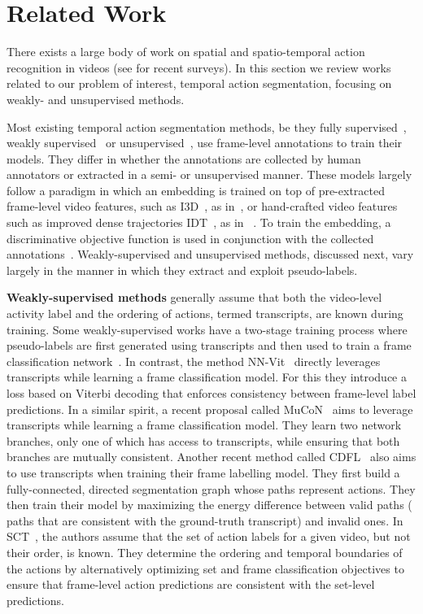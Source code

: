 \documentclass[10pt,twocolumn,letterpaper]{article}
\begin{document}
 \section{Related Work}
There exists a large body of work on spatial and spatio-temporal action recognition in videos (see \cite{herath2017going,asadi2017deep} for recent surveys). In this section we review works related to our problem of interest, temporal action segmentation, focusing on weakly- and unsupervised methods.

Most existing temporal action segmentation methods, be they fully supervised~\cite{ute_6,ute_15,kuehne2018hybrid}, weakly supervised~\cite{mucon,cdfl,nnv,sct} or unsupervised~\cite{ute_paper,mallow,yti_paper}, use frame-level annotations to train their models. They differ in whether the annotations are collected by human annotators or extracted in a semi- or unsupervised manner. 
These models largely follow a paradigm in which an embedding is trained on top of pre-extracted frame-level video features, such as I3D~\cite{i3d}, as in~\cite{mucon,sct}, or hand-crafted video features such as improved dense trajectories IDT~\cite{idt}, as in~ \cite{cdfl,mallow,ute_paper,ute_7,ute_24}.
To train the embedding, a discriminative objective function is used in conjunction with the collected annotations~\cite{cdfl,mallow,ute_7,ute_24,nnv,mucon}. Weakly-supervised and unsupervised methods, discussed next, vary largely in the manner in which they extract and exploit pseudo-labels.
 
\noindent\textbf{Weakly-supervised methods} generally assume that both the video-level activity label and the ordering of actions, termed transcripts, are known during training.
Some weakly-supervised works have a two-stage training process where pseudo-labels are first generated using transcripts and then used to train a frame classification network~\cite{ute_17,ute_24}.
In contrast, the method NN-Vit~\cite{nnv} directly leverages transcripts while learning a frame classification model. For this they introduce a loss based on Viterbi decoding that enforces consistency between frame-level label predictions. In a similar spirit, a recent proposal called MuCoN~\cite{mucon} aims to leverage transcripts while learning a frame classification model. They learn two network branches, only one of which has access to transcripts, while ensuring that both branches are mutually consistent.
Another recent method called CDFL~\cite{cdfl} also aims to use transcripts when training their frame labelling model. They first build a fully-connected, directed segmentation graph whose paths represent actions. They then train their model by maximizing the energy difference between valid paths ( paths that are consistent with the ground-truth transcript) and invalid ones. 
In SCT~\cite{sct}, the authors assume that the set of action labels for a given video, but not their order, is known. They determine the ordering and temporal boundaries of the actions by alternatively optimizing set and frame classification objectives to ensure that frame-level action predictions are consistent with the set-level predictions.
\end{document}
